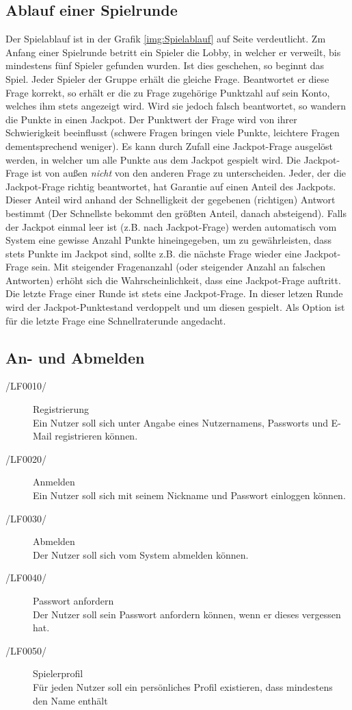 \documentclass[11pt,a4paper]{scrreprt}
\begin{document}
\subsection{Ablauf einer Spielrunde}
Der Spielablauf ist in der Grafik \ref{img:Spielablauf} auf Seite \pageref{img:Spielablauf} verdeutlicht.
Zm Anfang einer Spielrunde betritt ein Spieler die Lobby, in welcher er verweilt, bis mindestens fünf Spieler gefunden wurden. Ist dies geschehen, so beginnt das Spiel. Jeder Spieler der Gruppe erhält die gleiche Frage. Beantwortet er diese Frage korrekt, so erhält er die zu Frage zugehörige Punktzahl auf sein Konto, welches ihm stets angezeigt wird. Wird sie jedoch falsch beantwortet, so wandern die Punkte in einen Jackpot. Der Punktwert der Frage wird von ihrer Schwierigkeit beeinflusst (schwere Fragen bringen viele Punkte, leichtere Fragen dementsprechend weniger). Es kann durch Zufall eine Jackpot-Frage ausgelöst werden, in welcher um alle Punkte aus dem Jackpot gespielt wird. Die Jackpot-Frage ist von außen \textit{nicht} von den anderen Frage zu unterscheiden. Jeder, der die Jackpot-Frage richtig beantwortet, hat Garantie auf einen Anteil des Jackpots. Dieser Anteil wird anhand der Schnelligkeit der gegebenen (richtigen) Antwort bestimmt (Der Schnellste bekommt den größten Anteil, danach absteigend). Falls der Jackpot einmal leer ist (z.B. nach Jackpot-Frage) werden automatisch vom System eine gewisse Anzahl Punkte hineingegeben, um zu gewährleisten, dass stets Punkte im Jackpot sind, sollte z.B. die nächste Frage wieder eine Jackpot-Frage sein. Mit steigender Fragenanzahl (oder steigender Anzahl an falschen Antworten) erhöht sich die Wahrscheinlichkeit, dass eine Jackpot-Frage auftritt. Die letzte Frage einer Runde ist stets eine Jackpot-Frage. In dieser letzen Runde wird der Jackpot-Punktestand verdoppelt und um diesen gespielt. Als Option ist für die letzte Frage eine Schnellraterunde angedacht.
\subsection{An- und Abmelden}
\begin{description}
\item[/LF0010/] Registrierung \\
Ein Nutzer soll sich unter Angabe eines Nutzernamens, Passworts und E-Mail registrieren können.
\item[/LF0020/] Anmelden \\
Ein Nutzer soll sich mit seinem Nickname und Passwort einloggen können.
\item[/LF0030/] Abmelden \\
Der Nutzer soll sich vom System abmelden können.
\item[/LF0040/] Passwort anfordern \\
Der Nutzer soll sein Passwort anfordern können, wenn er dieses vergessen hat.
\item[/LF0050/] Spielerprofil \\
Für jeden Nutzer soll ein persönliches Profil existieren, dass mindestens den Name enthält
\end{description}
\end{document}
